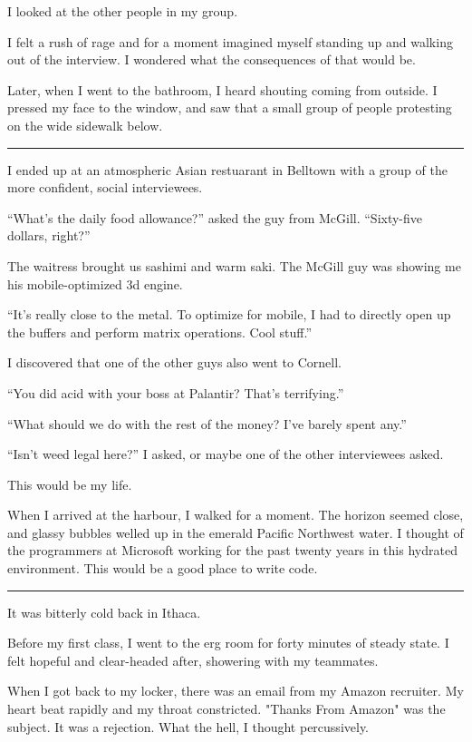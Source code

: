I looked at the other people in my group. 

I felt a rush of rage and for a moment imagined myself standing up and walking
out of the interview.  I wondered what the consequences of that would be.  

Later, when I went to the bathroom, I heard shouting coming from outside.  I
pressed my face to the window, and saw that a small group of people protesting
on the wide sidewalk below.

\plainfancybreak{12pt}{2}{* * *}

I ended up at an atmospheric Asian restuarant in Belltown with a group of the
more confident, social interviewees. 

``What's the daily food allowance?'' asked the guy from McGill. ``Sixty-five
dollars, right?''

The waitress brought us sashimi and warm saki.  The McGill guy was showing me
his mobile-optimized 3d engine.

``It's really close to the metal.  To optimize for mobile, I had to directly
open up the buffers and perform matrix operations.  Cool stuff.''

I discovered that one of the other guys also went to Cornell.  

``You did acid with your boss at Palantir?  That's terrifying.''

``What should we do with the rest of the money?  I've barely spent any.''

``Isn't weed legal here?'' I asked, or maybe one of the other interviewees
asked.


This would be my life.


When I arrived at the harbour, I walked for a moment.  The horizon seemed close,
and glassy bubbles welled up in the emerald Pacific Northwest water.  I thought
of the programmers at Microsoft working for the past twenty years in this
hydrated environment.  This would be a good place to write code.

\plainfancybreak{12pt}{2}{* * *}

It was bitterly cold back in Ithaca.

Before my first class, I went to the erg room for forty minutes of steady state.
I felt hopeful and clear-headed after, showering with my teammates.

When I got back to my locker, there was an email from my Amazon recruiter.  My
heart beat rapidly and my throat constricted.  "Thanks From Amazon" was the
subject.  It was a rejection.  What the hell, I thought percussively. 

